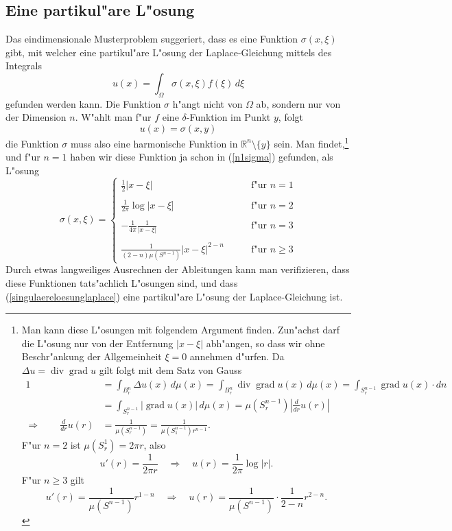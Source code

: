\subsection{Eine partikul"are L"osung}
Das eindimensionale Musterproblem suggeriert, dass es eine
Funktion $\sigma(x,\xi)$ gibt, mit welcher eine partikul"are L"osung
der Laplace-Gleichung mittels des Integrals
\begin{equation}
u(x)=\int_\Omega \sigma(x,\xi)  f(\xi)\,d\xi
\label{singulaereloesunglaplace}
\end{equation}
gefunden werden kann. Die Funktion $\sigma$ h"angt nicht von $\Omega$
ab, sondern nur von der Dimension $n$. W"ahlt man f"ur $f$ eine
$\delta$-Funktion im Punkt $y$, folgt
\[
u(x)=\sigma(x,y)
\]
die Funktion $\sigma$ muss also eine harmonische Funktion in 
$\mathbb R^n\setminus\{y\}$ sein.
Man findet,\footnote{Man kann
diese L"osungen mit folgendem Argument finden. Zun"achst darf die L"osung
nur von der Entfernung $|x-\xi|$ abh"angen, so dass wir ohne
Beschr"ankung der Allgemeinheit $\xi=0$ annehmen d"urfen.
Da $\Delta u=\operatorname{div}\operatorname{grad}u$ gilt folgt mit
dem Satz von Gauss
\begin{align*}
1&=\int_{B_r^n} \Delta u(x)\,d\mu(x)
=
\int_{B_r^n} \operatorname{div}\operatorname{grad} u(x)\,d\mu(x)
=\int_{S_r^{n-1}}\operatorname{grad}u(x)\cdot dn
\\
&=\int_{S_r^{n-1}}|\operatorname{grad}u(x)|\,d\mu(x)
=\mu(S_r^{n-1})\left|\frac{d}{dr}u(r)\right|
\\
\Rightarrow\qquad\frac{d}{dr}u(r)
&=\frac1{\mu(S_r^{n-1})}
=\frac1{\mu(S_1^{n-1})r^{n-1}}.
\end{align*}
F"ur $n=2$ ist $\mu(S_r^1)=2\pi r$, also
\[
u'(r)=\frac1{2\pi r}\quad\Rightarrow\quad u(r)=\frac1{2\pi}\log|r|.
\]
F"ur $n\ge 3$ gilt
\[
u'(r)=\frac1{\mu(S^{n-1})}r^{1-n}\quad\Rightarrow\quad u(r)=\frac1{\mu(S^{n-1})}\cdot \frac1{2-n}r^{2-n}.
\]
} und f"ur $n=1$ haben wir diese Funktion ja schon in (\ref{n1sigma})
gefunden,
als L"osung
\begin{equation}
\sigma(x,\xi)=
\begin{cases}
\displaystyle \frac12|x-\xi|
&\qquad \text{f"ur $n=1$}
\\
\\
\displaystyle \frac1{2\pi}\log|x-\xi]
&\qquad \text{f"ur $n=2$}
\\
\\
\displaystyle -\frac1{4\pi}\frac1{|x-\xi|}
&\qquad \text{f"ur $n= 3$}
\\
\\
\displaystyle \frac1{(2-n)\mu(S^{n-1})}|x-\xi|^{2-n}
&\qquad \text{f"ur $n\ge 3$}
\end{cases}
\end{equation}
Durch etwas langweiliges Ausrechnen der Ableitungen kann man verifizieren,
dass diese Funktionen tats"achlich L"osungen sind, und dass
(\ref{singulaereloesunglaplace}) eine partikul"are L"osung der
Laplace-Gleichung ist.

